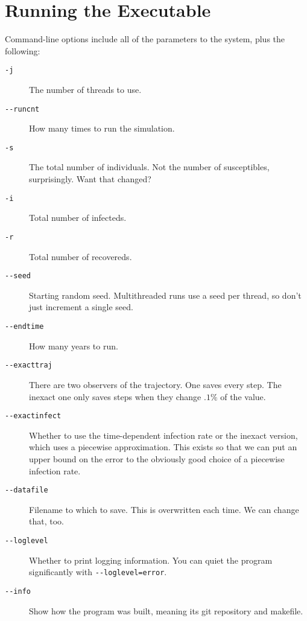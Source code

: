 \documentclass{article}
\begin{document}
\section{Running the Executable}
Command-line options include all of the parameters to the system, plus the following:
\newcommand{\opt}[1]{\texttt{#1}}
\begin{description}
  \item[\opt{-j}] The number of threads to use.
  \item[\opt{-{}-runcnt}] How many times to run the simulation.
  \item[\opt{-s}] The total number of individuals. Not the number of susceptibles,
   surprisingly. Want that changed?
  \item[\opt{-i}] Total number of infecteds.
  \item[\opt{-r}] Total number of recovereds.
  \item[\opt{-{}-seed}] Starting random seed. Multithreaded runs use a seed per thread, so don't just increment a single seed.
  \item[\opt{-{}-endtime}] How many years to run.
  \item[\opt{-{}-exacttraj}] There are two observers of the trajectory. One saves
  every step. The inexact one only saves steps when they change $.1\%$ of the value.
  \item[\opt{-{}-exactinfect}] Whether to use the time-dependent infection rate
  or the inexact version, which uses a piecewise approximation. This exists so that
  we can put an upper bound on the error to the obviously good choice of a piecewise infection rate.
  \item[\opt{-{}-datafile}] Filename to which to save. This is overwritten each time.
  We can change that, too.
  \item[\opt{-{}-loglevel}] Whether to print logging information. You can quiet the program significantly with \opt{-{}-loglevel=error}.
  \item[\opt{-{}-info}] Show how the program was built, meaning its git repository
  and makefile.
\end{description}
\end{document}
